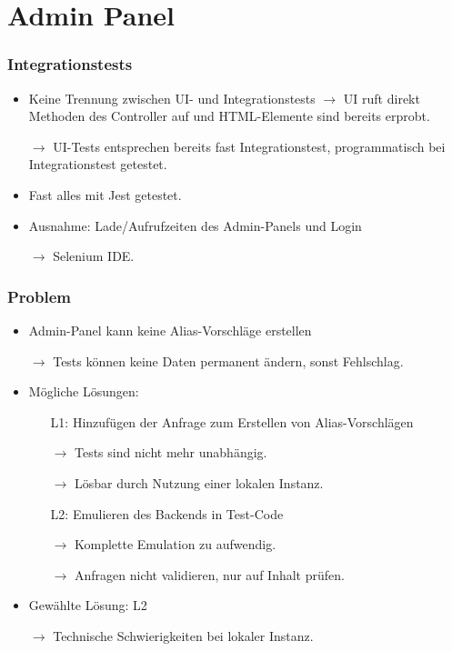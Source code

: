 \section{Admin Panel}

\begin{frame}\frametitle{Integrationstests}
    \begin{itemize}
        \item Keine Trennung zwischen UI- und Integrationstests $\rightarrow$ UI ruft direkt Methoden des Controller auf 
            und HTML-Elemente sind bereits erprobt. 
        \item[$\rightarrow$] UI-Tests entsprechen bereits fast Integrationstest, programmatisch bei Integrationstest getestet.
        \item Fast alles mit Jest getestet.
        \item Ausnahme: Lade/Aufrufzeiten des Admin-Panels und Login
        \item[$\rightarrow$] Selenium IDE.
    \end{itemize}
\end{frame}

\begin{frame}\frametitle{Problem}
    \begin{itemize}
        \item Admin-Panel kann keine Alias-Vorschläge erstellen
        \item[$\rightarrow$] Tests können keine Daten permanent ändern, sonst Fehlschlag.
        \item Mögliche Lösungen: \begin{itemize}
            \item[L1:] Hinzufügen der Anfrage zum Erstellen von Alias-Vorschlägen
            \item[$\rightarrow$] Tests sind nicht mehr unabhängig.
            \item[$\rightarrow$] Lösbar durch Nutzung einer lokalen Instanz. 
            \item[L2:] Emulieren des Backends in Test-Code
            \item[$\rightarrow$] Komplette Emulation zu aufwendig.
            \item[$\rightarrow$] Anfragen nicht validieren, nur auf Inhalt prüfen.
        \end{itemize} 
        \pause
        \item Gewählte Lösung: L2
        \item[$\rightarrow$] Technische Schwierigkeiten bei lokaler Instanz.
    \end{itemize}
\end{frame}

